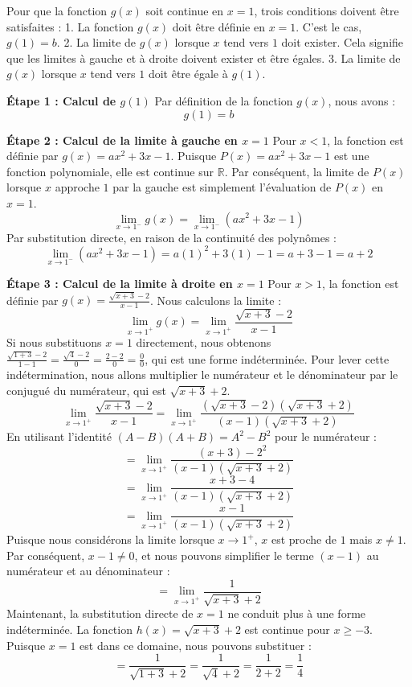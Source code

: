 \documentclass[12pt,a4paper]{report}
\begin{document}
Pour que la fonction $g(x)$ soit continue en $x=1$, trois conditions doivent être satisfaites :
1.  La fonction $g(x)$ doit être définie en $x=1$. C'est le cas, $g(1) = b$.
2.  La limite de $g(x)$ lorsque $x$ tend vers $1$ doit exister. Cela signifie que les limites à gauche et à droite doivent exister et être égales.
3.  La limite de $g(x)$ lorsque $x$ tend vers $1$ doit être égale à $g(1)$.

\textbf{Étape 1 : Calcul de $g(1)$}
Par définition de la fonction $g(x)$, nous avons :
$$
g(1) = b
$$

\textbf{Étape 2 : Calcul de la limite à gauche en $x=1$}
Pour $x < 1$, la fonction est définie par $g(x) = ax^2 + 3x - 1$.
Puisque $P(x) = ax^2 + 3x - 1$ est une fonction polynomiale, elle est continue sur $\mathbb{R}$. Par conséquent, la limite de $P(x)$ lorsque $x$ approche $1$ par la gauche est simplement l'évaluation de $P(x)$ en $x=1$.
$$
\lim_{x \to 1^-} g(x) = \lim_{x \to 1^-} (ax^2 + 3x - 1)
$$
Par substitution directe, en raison de la continuité des polynômes :
$$
\lim_{x \to 1^-} (ax^2 + 3x - 1) = a(1)^2 + 3(1) - 1 = a + 3 - 1 = a + 2
$$

\textbf{Étape 3 : Calcul de la limite à droite en $x=1$}
Pour $x > 1$, la fonction est définie par $g(x) = \frac{\sqrt{x+3}-2}{x-1}$.
Nous calculons la limite :
$$
\lim_{x \to 1^+} g(x) = \lim_{x \to 1^+} \frac{\sqrt{x+3}-2}{x-1}
$$
Si nous substituons $x=1$ directement, nous obtenons $\frac{\sqrt{1+3}-2}{1-1} = \frac{\sqrt{4}-2}{0} = \frac{2-2}{0} = \frac{0}{0}$, qui est une forme indéterminée.
Pour lever cette indétermination, nous allons multiplier le numérateur et le dénominateur par le conjugué du numérateur, qui est $\sqrt{x+3}+2$.
$$
\lim_{x \to 1^+} \frac{\sqrt{x+3}-2}{x-1} = \lim_{x \to 1^+} \frac{(\sqrt{x+3}-2)(\sqrt{x+3}+2)}{(x-1)(\sqrt{x+3}+2)}
$$
En utilisant l'identité $(A-B)(A+B) = A^2 - B^2$ pour le numérateur :
$$
= \lim_{x \to 1^+} \frac{(x+3) - 2^2}{(x-1)(\sqrt{x+3}+2)}
$$
$$
= \lim_{x \to 1^+} \frac{x+3 - 4}{(x-1)(\sqrt{x+3}+2)}
$$
$$
= \lim_{x \to 1^+} \frac{x-1}{(x-1)(\sqrt{x+3}+2)}
$$
Puisque nous considérons la limite lorsque $x \to 1^+$, $x$ est proche de $1$ mais $x \ne 1$. Par conséquent, $x-1 \ne 0$, et nous pouvons simplifier le terme $(x-1)$ au numérateur et au dénominateur :
$$
= \lim_{x \to 1^+} \frac{1}{\sqrt{x+3}+2}
$$
Maintenant, la substitution directe de $x=1$ ne conduit plus à une forme indéterminée. La fonction $h(x) = \sqrt{x+3}+2$ est continue pour $x \ge -3$. Puisque $x=1$ est dans ce domaine, nous pouvons substituer :
$$
= \frac{1}{\sqrt{1+3}+2} = \frac{1}{\sqrt{4}+2} = \frac{1}{2+2} = \frac{1}{4}
$$
\end{document}
